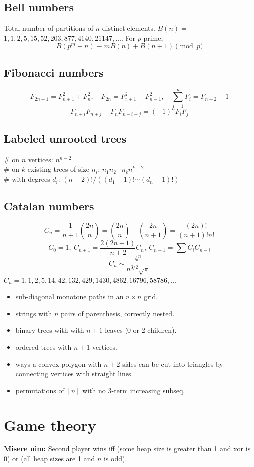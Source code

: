 	\subsection{Bell numbers}
		Total number of partitions of $n$ distinct elements. $B(n) =$
		$1, 1, 2, 5, 15, 52, 203, 877, 4140, 21147, \dots$. For $p$ prime,
		\[ B(p^m+n)\equiv mB(n)+B(n+1) \pmod{p} \]

	\subsection{Fibonacci numbers}
		\[ F_{2n+1} = F_{n+1}^{2} + F_{n}^{2}, \quad F_{2n} = F_{n+1}^{2} - F_{n-1}^{2}, \quad \sum_{i=1}^{n} F_{i} = F_{n+2} - 1 \]
		\[ F_{n+i} F_{n+j} - F_{n} F_{n+i+j} = (-1)^n F_{i} F_{j} \]

	\subsection{Labeled unrooted trees}
		\# on $n$ vertices: $n^{n-2}$ \\
		\# on $k$ existing trees of size $n_i$: $n_1n_2\cdots n_k n^{k-2}$ \\
		\# with degrees $d_i$: $(n-2)! / ((d_1-1)! \cdots (d_n-1)!)$

	\subsection{Catalan numbers}
		\[ C_n=\frac{1}{n+1}\binom{2n}{n}= \binom{2n}{n}-\binom{2n}{n+1} = \frac{(2n)!}{(n+1)!n!} \]
		\[ C_0=1,\ C_{n+1} = \frac{2(2n+1)}{n+2}C_n,\ C_{n+1}=\sum C_iC_{n-i} \]
		\[ C_n \sim \frac{4^{n}}{n^{3/2} \sqrt{\pi}} \]
		${C_n = 1, 1, 2, 5, 14, 42, 132, 429, 1430, 4862, 16796, 58786, \dots}$
		\begin{itemize}[noitemsep]
			\item sub-diagonal monotone paths in an $n\times n$ grid.
			\item strings with $n$ pairs of parenthesis, correctly nested.
			\item binary trees with with $n+1$ leaves (0 or 2 children).
			\item ordered trees with $n+1$ vertices.
			\item ways a convex polygon with $n+2$ sides can be cut into triangles by connecting vertices with straight lines.
			\item permutations of $[n]$ with no 3-term increasing subseq.
		\end{itemize}

	\section{Game theory}
		\textbf{Misere nim:} Second player wins iff (some heap size is greater than 1 and xor is 0) or (all heap sizes are 1 and $n$ is odd).

